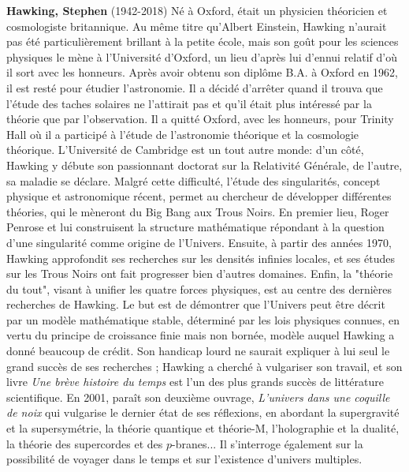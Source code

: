\textbf{Hawking, Stephen} (1942-2018) Né à Oxford, était un physicien théoricien et cosmologiste britannique. Au même titre qu'Albert Einstein, Hawking n'aurait pas été particulièrement brillant à la petite école, mais son goût pour les sciences physiques le mène à l'Université d'Oxford, un lieu d'après lui d'ennui relatif d'où il sort avec les honneurs. Après avoir obtenu son diplôme B.A. à Oxford en 1962, il est resté pour étudier l'astronomie. Il a décidé d'arrêter quand il trouva que l'étude des taches solaires ne l'attirait pas et qu'il était plus intéressé par la théorie que par l'observation. Il a quitté Oxford, avec les honneurs, pour Trinity Hall où il a participé à l'étude de l'astronomie théorique et la cosmologie théorique. L'Université de Cambridge est un tout autre monde: d'un côté, Hawking y débute son passionnant doctorat sur la Relativité Générale, de l'autre, sa maladie se déclare. Malgré cette difficulté, l'étude des singularités, concept physique et astronomique récent, permet au chercheur de développer différentes théories, qui le mèneront du Big Bang aux Trous Noirs. En premier lieu, Roger Penrose et lui construisent la structure mathématique répondant à la question d'une singularité comme origine de l'Univers. Ensuite, à partir des années 1970, Hawking approfondit ses recherches sur les densités infinies locales, et ses études sur les Trous Noirs ont fait progresser bien d'autres domaines. Enfin, la "théorie du tout", visant à unifier les quatre forces physiques, est au centre des dernières recherches de Hawking. Le but est de démontrer que l'Univers peut être décrit par un modèle mathématique stable, déterminé par les lois physiques connues, en vertu du principe de croissance finie mais non bornée, modèle auquel Hawking a donné beaucoup de crédit. Son handicap lourd ne saurait expliquer à lui seul le grand succès de ses recherches ; Hawking a cherché à vulgariser son travail, et son livre \textit{Une brève histoire du temps} est l'un des plus grands succès de littérature scientifique. En 2001, paraît son deuxième ouvrage, \textit{L'univers dans une coquille de noix} qui vulgarise le dernier état de ses réflexions, en abordant la supergravité et la supersymétrie, la théorie quantique et théorie-M, l'holographie et la dualité, la théorie des supercordes et des $p$-branes... Il s'interroge également sur la possibilité de voyager dans le temps et sur l'existence d'univers multiples.

